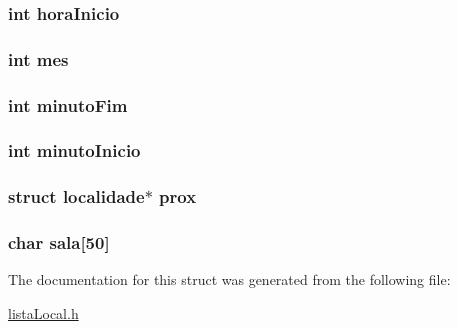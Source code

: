 \subsubsection[{hora\+Inicio}]{\setlength{\rightskip}{0pt plus 5cm}int hora\+Inicio}\label{structlocalidade_a5495bac9e9c2b1154d018a03a2786397}
\hypertarget{structlocalidade_a9fc86758220eae0e735655f81fd9d9bc}{}
\subsubsection[{mes}]{\setlength{\rightskip}{0pt plus 5cm}int mes}\label{structlocalidade_a9fc86758220eae0e735655f81fd9d9bc}
\hypertarget{structlocalidade_af994944b0c6881ec51c00cf9c1a1aa10}{}
\subsubsection[{minuto\+Fim}]{\setlength{\rightskip}{0pt plus 5cm}int minuto\+Fim}\label{structlocalidade_af994944b0c6881ec51c00cf9c1a1aa10}
\hypertarget{structlocalidade_a12abfd10f7bc791e8ec4f457078271c6}{}
\subsubsection[{minuto\+Inicio}]{\setlength{\rightskip}{0pt plus 5cm}int minuto\+Inicio}\label{structlocalidade_a12abfd10f7bc791e8ec4f457078271c6}
\hypertarget{structlocalidade_a727939630bcae691100192e273b88900}{}
\subsubsection[{prox}]{\setlength{\rightskip}{0pt plus 5cm}struct {\bf localidade}$\ast$ prox}\label{structlocalidade_a727939630bcae691100192e273b88900}
\hypertarget{structlocalidade_a7609c4270fb3307a06848edee43c1957}{}
\subsubsection[{sala}]{\setlength{\rightskip}{0pt plus 5cm}char sala\mbox{[}50\mbox{]}}\label{structlocalidade_a7609c4270fb3307a06848edee43c1957}


The documentation for this struct was generated from the following file\+:\begin{DoxyCompactItemize}
\item 
\hyperlink{lista_local_8h}{lista\+Local.\+h}\end{DoxyCompactItemize}
